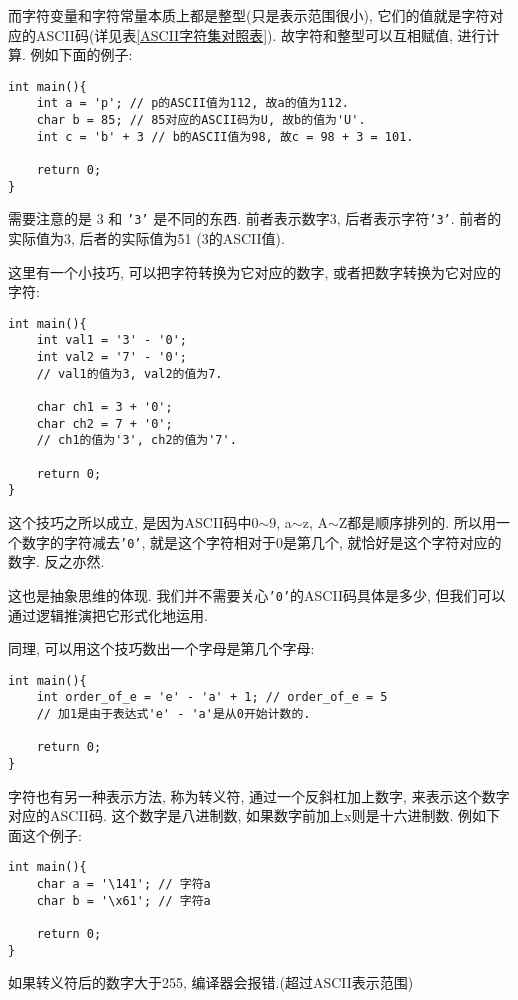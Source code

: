         而字符变量和字符常量本质上都是整型(只是表示范围很小), 它们的值就是字符对应的ASCII码(详见表\ref{ASCII字符集对照表}). 故字符和整型可以互相赋值, 进行计算. 例如下面的例子:
\begin{lstlisting}
int main(){
    int a = 'p'; // p的ASCII值为112, 故a的值为112.
    char b = 85; // 85对应的ASCII码为U, 故b的值为'U'.
    int c = 'b' + 3 // b的ASCII值为98, 故c = 98 + 3 = 101.

    return 0;
}
\end{lstlisting}

        需要注意的是 3 和 \texttt{'3'} 是不同的东西. 前者表示数字3, 后者表示字符\texttt{'3'}. 前者的实际值为3, 后者的实际值为51 (3的ASCII值).

        这里有一个小技巧, 可以把字符转换为它对应的数字, 或者把数字转换为它对应的字符:
\begin{lstlisting}
int main(){
    int val1 = '3' - '0'; 
    int val2 = '7' - '0';
    // val1的值为3, val2的值为7.

    char ch1 = 3 + '0';
    char ch2 = 7 + '0';
    // ch1的值为'3', ch2的值为'7'.

    return 0;
}
\end{lstlisting}
        
        这个技巧之所以成立, 是因为ASCII码中0$\sim$9, a$\sim$z, A$\sim$Z都是顺序排列的. 所以用一个数字的字符减去\texttt{'0'}, 就是这个字符相对于0是第几个, 就恰好是这个字符对应的数字. 反之亦然.

        这也是抽象思维的体现. 我们并不需要关心\texttt{'0'}的ASCII码具体是多少, 但我们可以通过逻辑推演把它形式化地运用.

        同理, 可以用这个技巧数出一个字母是第几个字母:
\begin{lstlisting}
int main(){
    int order_of_e = 'e' - 'a' + 1; // order_of_e = 5
    // 加1是由于表达式'e' - 'a'是从0开始计数的.

    return 0;
}
\end{lstlisting}

        字符也有另一种表示方法, 称为转义符, 通过一个反斜杠加上数字, 来表示这个数字对应的ASCII码. 这个数字是八进制数, 如果数字前加上x则是十六进制数. 例如下面这个例子:
\begin{lstlisting}
int main(){
    char a = '\141'; // 字符a
    char b = '\x61'; // 字符a

    return 0;
}
\end{lstlisting}

        如果转义符后的数字大于255, 编译器会报错.(超过ASCII表示范围)

